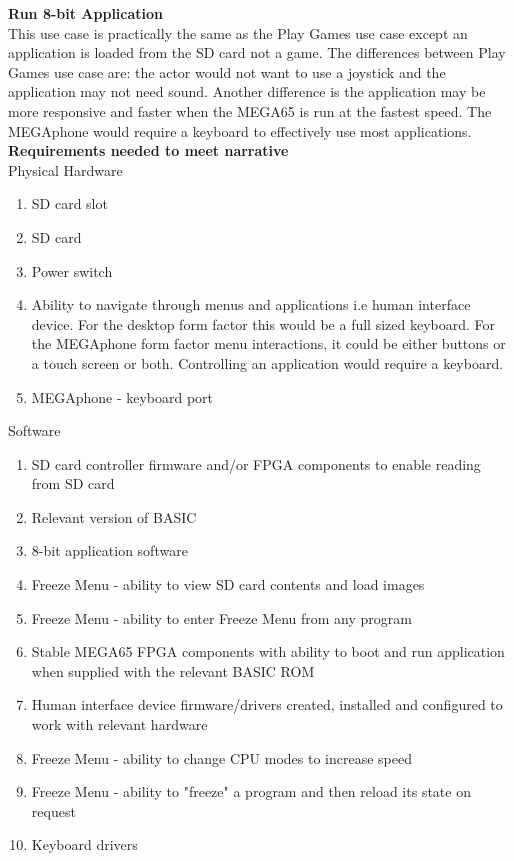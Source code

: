 \textbf{Run 8-bit Application}\\
This use case is practically the same as the Play Games use case except an application is loaded from the SD card not a game. The differences between Play Games use case are: the actor would not want to use a joystick and the application may not need sound. Another difference is the application may be more responsive and faster when the MEGA65 is run at the fastest speed. The MEGAphone would require a keyboard to effectively use most applications.\\

\textbf{Requirements needed to meet narrative}\\
Physical Hardware
\begin{enumerate}
\item SD card slot
\item SD card
\item Power switch
\item Ability to navigate through menus and applications i.e human interface device. For the desktop form factor this would be a full sized keyboard. For the MEGAphone form factor menu interactions, it could be either buttons or a touch screen or both. Controlling an application would require a keyboard.
\item MEGAphone - keyboard port
\end{enumerate}

Software\\
\begin{enumerate}
\item SD card controller firmware and/or FPGA components to enable reading from SD card
\item Relevant version of BASIC 
\item 8-bit application software
\item Freeze Menu - ability to view SD card contents and load images
\item Freeze Menu - ability to enter Freeze Menu from any program
\item Stable MEGA65 FPGA components with ability to boot and run application when supplied with the relevant BASIC ROM
\item Human interface device firmware/drivers created, installed and configured to work with relevant hardware
\item Freeze Menu - ability to change CPU modes to increase speed
\item Freeze Menu - ability to "freeze" a program and then reload its state on request
\item Keyboard drivers
\end{enumerate}

